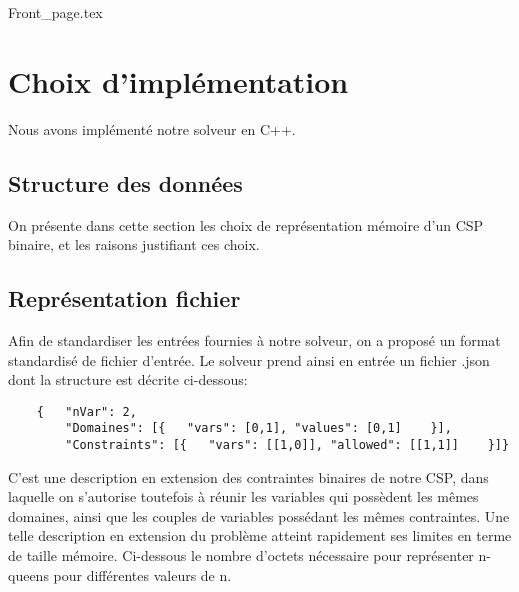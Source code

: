 \documentclass[14pt]{article}
\begin{document}
\renewcommand{\footrulewidth}{0.4pt}
\renewcommand{\headrulewidth}{0.4pt}

\vspace{0cm}              %


{Front_page.tex}

\clearpage
\thispagestyle{fancy}
\tableofcontents
\thispagestyle{fancy}      %

\clearpage

\section{Choix d'implémentation}

Nous avons implémenté notre solveur en C++.

\subsection{Structure des données}

On présente dans cette section les choix de représentation mémoire d'un CSP binaire, et les raisons justifiant ces choix.

\subsection{Représentation fichier}

Afin de standardiser les entrées fournies à notre solveur, on a proposé un format standardisé de fichier d'entrée. Le solveur prend ainsi en entrée un fichier .json dont la structure est décrite ci-dessous:

\begin{verbatim}
	{   "nVar": 2,
	    "Domaines": [{   "vars": [0,1], "values": [0,1]    }],
	    "Constraints": [{   "vars": [[1,0]], "allowed": [[1,1]]    }]}
\end{verbatim}

C'est une description en extension des contraintes binaires de notre CSP, dans laquelle on s'autorise toutefois à réunir les variables qui possèdent les mêmes domaines, ainsi que les couples de variables possédant les mêmes contraintes. Une telle description en extension du problème atteint rapidement ses limites en terme de taille mémoire. Ci-dessous le nombre d'octets nécessaire pour représenter n-queens pour différentes valeurs de n.
\end{document}
